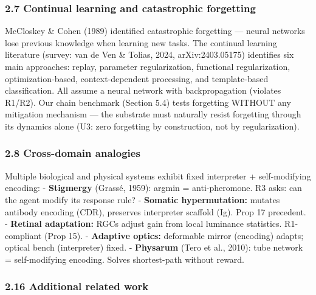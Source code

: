 \documentclass[
  11pt,
]{article}
\begin{document}
\subsubsection{2.7 Continual learning and catastrophic
forgetting}\label{continual-learning-and-catastrophic-forgetting}

McCloskey \& Cohen (1989) identified catastrophic forgetting --- neural
networks lose previous knowledge when learning new tasks. The continual
learning literature (survey: van de Ven \& Tolias, 2024,
arXiv:2403.05175) identifies six main approaches: replay, parameter
regularization, functional regularization, optimization-based,
context-dependent processing, and template-based classification. All
assume a neural network with backpropagation (violates R1/R2). Our chain
benchmark (Section 5.4) tests forgetting WITHOUT any mitigation
mechanism --- the substrate must naturally resist forgetting through its
dynamics alone (U3: zero forgetting by construction, not by
regularization).

\subsubsection{2.8 Cross-domain analogies}\label{cross-domain-analogies}

Multiple biological and physical systems exhibit fixed interpreter +
self-modifying encoding: - \textbf{Stigmergy} (Grassé, 1959): argmin =
anti-pheromone. R3 asks: can the agent modify its response rule? -
\textbf{Somatic hypermutation:} mutates antibody encoding (CDR),
preserves interpreter scaffold (Ig). Prop 17 precedent. -
\textbf{Retinal adaptation:} RGCs adjust gain from local luminance
statistics. R1-compliant (Prop 15). - \textbf{Adaptive optics:}
deformable mirror (encoding) adapts; optical bench (interpreter) fixed.
- \textbf{Physarum} (Tero et al., 2010): tube network = self-modifying
encoding. Solves shortest-path without reward.

\subsubsection{2.16 Additional related
work}\label{additional-related-work}
\end{document}
